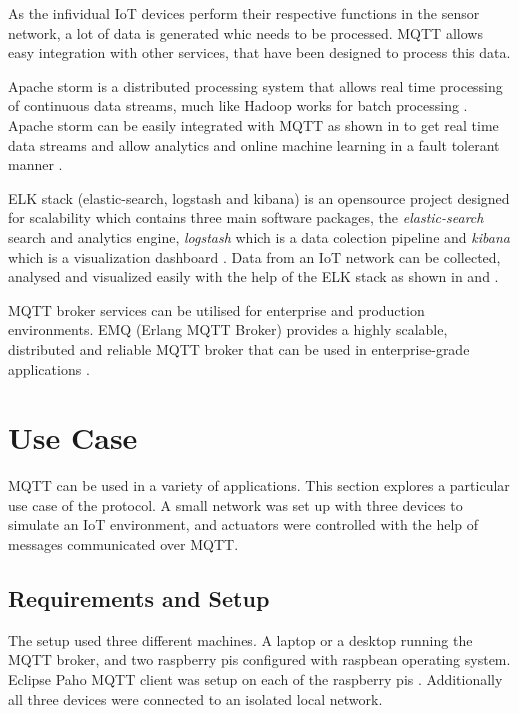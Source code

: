 \documentclass[sigconf]{acmart}
\begin{document}
As the infividual IoT devices perform their respective functions in
the sensor network, a lot of data is generated whic needs to be
processed. MQTT allows easy integration with other services, that have
been designed to process this data.

Apache storm is a distributed processing system that allows real time
processing of continuous data streams, much like Hadoop works for
batch processing \cite{apache-storm}. Apache storm can be easily
integrated with MQTT as shown in \cite{apache-storm-mqtt} to get real
time data streams and allow analytics and online machine learning in a
fault tolerant manner \citep{apache-storm-wiki}.

ELK stack (elastic-search, logstash and kibana) is an opensource
project designed for scalability which contains three main software
packages, the {\em elastic-search} search and analytics engine, {\em
  logstash} which is a data colection pipeline and {\em kibana} which
is a visualization dashboard \cite{elk-stack}. Data from an IoT
network can be collected, analysed and visualized easily with the help
of the ELK stack as shown in \cite{mqtt-elasticsearch-setup} and
\cite{kibana-mqtt-analysis}.

MQTT broker services can be utilised for enterprise and production
environments. EMQ (Erlang MQTT Broker) provides a highly scalable,
distributed and reliable MQTT broker that can be used in
enterprise-grade applications \cite{erlang-mqtt-broker}.


\section{Use Case}

MQTT can be used in a variety of applications. This section explores a
particular use case of the protocol. A small network was set up with
three devices to simulate an IoT environment, and actuators were
controlled with the help of messages communicated over MQTT.

\subsection{Requirements and Setup}

The setup used three different machines. A laptop or a desktop running
the MQTT broker, and two raspberry pis configured with raspbean
operating system. Eclipse Paho MQTT client was setup on each of the
raspberry pis \cite{python-paho-mqtt}. Additionally all three devices
were connected to an isolated local network.
\end{document}
